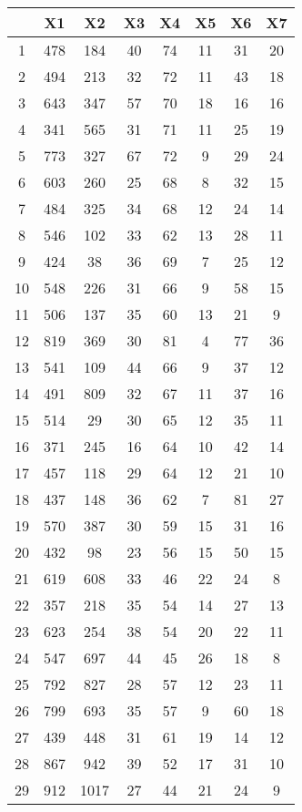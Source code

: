 \documentclass[12pt]{report}\usepackage[]{graphicx}\usepackage[]{color}
\begin{document}
\begin{table}[ht!]
\centering
 \begin{tabular}{c|c|c|c|c|c|c|c} 
 &  X1 & X2 & X3 & X4 & X5 & X6 & X7 \\ \hline
1 & 478& 184& 40& 74& 11& 31& 20 \\
 \hline
2 & 494& 213& 32& 72& 11& 43& 18 \\
 \hline
3 & 643& 347& 57& 70& 18& 16& 16 \\
 \hline
4 & 341& 565& 31& 71& 11& 25& 19 \\
 \hline
5 & 773& 327& 67& 72& 9& 29& 24 \\
 \hline
6 & 603& 260& 25& 68& 8& 32& 15 \\
 \hline
7 & 484& 325& 34& 68& 12& 24& 14 \\
 \hline
8 & 546& 102& 33& 62& 13& 28& 11 \\
 \hline
9 & 424& 38& 36& 69& 7& 25& 12 \\
 \hline
10 & 548& 226& 31& 66& 9& 58& 15 \\
 \hline
11 & 506& 137& 35& 60& 13& 21& 9 \\
 \hline
12 & 819& 369& 30& 81& 4& 77& 36 \\
 \hline
13 & 541& 109& 44& 66& 9& 37& 12 \\
 \hline
14 & 491& 809& 32& 67& 11& 37& 16 \\
 \hline
15 & 514& 29& 30& 65& 12& 35& 11 \\
 \hline
16 & 371& 245& 16& 64& 10& 42& 14 \\
 \hline
17 & 457& 118& 29& 64& 12& 21& 10 \\
 \hline
18 & 437& 148& 36& 62& 7& 81& 27 \\
 \hline
19 & 570& 387& 30& 59& 15& 31& 16 \\
 \hline
20 & 432& 98& 23& 56& 15& 50& 15 \\
 \hline
21 & 619& 608& 33& 46& 22& 24& 8 \\
 \hline
22 & 357& 218& 35& 54& 14& 27& 13 \\
 \hline
23 & 623& 254& 38& 54& 20& 22& 11 \\
 \hline
24 & 547& 697& 44& 45& 26& 18& 8 \\
 \hline
25 & 792& 827& 28& 57& 12& 23& 11 \\
 \hline
26 & 799& 693& 35& 57& 9& 60& 18 \\
 \hline
27 & 439& 448& 31& 61& 19& 14& 12 \\
 \hline
28 & 867& 942& 39& 52& 17& 31& 10 \\
 \hline
29 & 912& 1017& 27& 44& 21& 24& 9 \\

\end{tabular}
\end{table}
\end{document}

